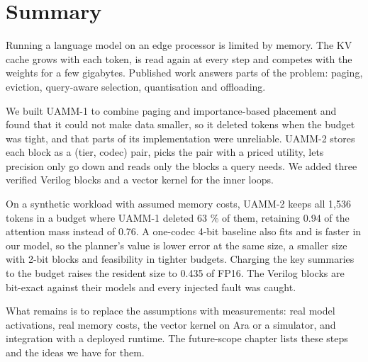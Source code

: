 \documentclass[12pt,a4paper]{report}
\begin{document}
\section{Summary}
Running a language model on an edge processor is limited by memory. The KV cache grows with each token, is read again at every step and competes with the weights for a few gigabytes. Published work answers parts of the problem: paging, eviction, query-aware selection, quantisation and offloading.

We built UAMM-1 to combine paging and importance-based placement and found that it could not make data smaller, so it deleted tokens when the budget was tight, and that parts of its implementation were unreliable. UAMM-2 stores each block as a (tier, codec) pair, picks the pair with a priced utility, lets precision only go down and reads only the blocks a query needs. We added three verified Verilog blocks and a vector kernel for the inner loops.

On a synthetic workload with assumed memory costs, UAMM-2 keeps all 1,536 tokens in a budget where UAMM-1 deleted 63 \% of them, retaining 0.94 of the attention mass instead of 0.76. A one-codec 4-bit baseline also fits and is faster in our model, so the planner's value is lower error at the same size, a smaller size with 2-bit blocks and feasibility in tighter budgets. Charging the key summaries to the budget raises the resident size to 0.435 of FP16. The Verilog blocks are bit-exact against their models and every injected fault was caught.

What remains is to replace the assumptions with measurements: real model activations, real memory costs, the vector kernel on Ara or a simulator, and integration with a deployed runtime. The future-scope chapter lists these steps and the ideas we have for them.
\end{document}
